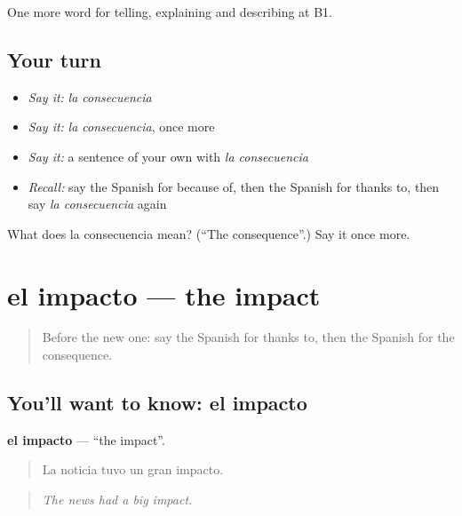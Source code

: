 \begin{grammarlens}[title={What you've built}]
One more word for telling, explaining and describing at B1.
\end{grammarlens}

\subsection*{Your turn}
\begin{itemize}
\raggedright
  \item \emph{Say it:} \emph{la consecuencia}
  \item \emph{Say it:} \emph{la consecuencia}, once more
  \item \emph{Say it:} a sentence of your own with \emph{la consecuencia}
  \item \emph{Recall:} say the Spanish for because of, then the Spanish for thanks to, then say \emph{la consecuencia} again
\end{itemize}

\begin{tcolorbox}[breakable,colback=teal!4,colframe=teal!35!black,title={Before you move on}]
What does la consecuencia mean? (\textquotedblleft{}The consequence\textquotedblright{}.) Say it once more.
\end{tcolorbox}
\section[el impacto]{el impacto — the impact}

\label{lesson:ES-C582-impacto}



\begin{quote}
Before the new one: say the Spanish for thanks to, then the Spanish for the consequence.
\end{quote}

\subsection*{You'll want to know: el impacto}
\textbf{el impacto} — \textquotedblleft{}the impact\textquotedblright{}.

\begin{quote}
La noticia tuvo un gran impacto.
\end{quote}

\begin{quote}
\emph{The news had a big impact.}
\end{quote}

